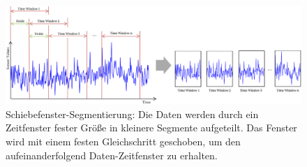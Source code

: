 \begin{figure}[h]
\includegraphics[width=\textwidth]{Images/segmentation.png} 
\caption[Schiebefenster-Segmentierung]{Schiebefenster-Segmentierung: Die Daten werden durch ein Zeitfenster fester Größe in kleinere Segmente aufgeteilt. Das Fenster wird mit einem festen Gleichschritt geschoben, um den aufeinanderfolgend Daten-Zeitfenster zu erhalten. }
\end{figure} 